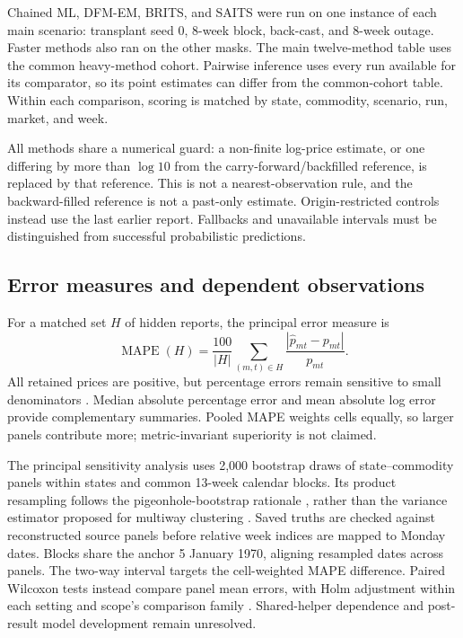 \documentclass[sigconf,nonacm,balance=false]{acmart}
\newcommand{\MAPE}{\operatorname{MAPE}}
\begin{document}
Chained ML, DFM-EM, BRITS, and SAITS were run on one instance of each main scenario: transplant seed 0, 8-week block, back-cast, and 8-week outage. Faster methods also ran on the other masks. The main twelve-method table uses the common heavy-method cohort. Pairwise inference uses every run available for its comparator, so its point estimates can differ from the common-cohort table. Within each comparison, scoring is matched by state, commodity, scenario, run, market, and week.

All methods share a numerical guard: a non-finite log-price estimate, or one differing by more than $\log 10$ from the carry-forward/backfilled reference, is replaced by that reference. This is not a nearest-observation rule, and the backward-filled reference is not a past-only estimate. Origin-restricted controls instead use the last earlier report. Fallbacks and unavailable intervals must be distinguished from successful probabilistic predictions.

\subsection{Error measures and dependent observations}

For a matched set $H$ of hidden reports, the principal error measure is
\begin{equation}\label{eq:mape}
\MAPE(H)=\frac{100}{|H|}\sum_{(m,t)\in H}
\frac{|\hat p_{mt}-p_{mt}|}{p_{mt}}.
\end{equation}
All retained prices are positive, but percentage errors remain sensitive to small denominators \cite{hyndman2006}. Median absolute percentage error and mean absolute log error provide complementary summaries. Pooled MAPE weights cells equally, so larger panels contribute more; metric-invariant superiority is not claimed.

The principal sensitivity analysis uses 2,000 bootstrap draws of state--commodity panels within states and common 13-week calendar blocks. Its product resampling follows the pigeonhole-bootstrap rationale \cite{owen2007}, rather than the variance estimator proposed for multiway clustering \cite{cameron2011}. Saved truths are checked against reconstructed source panels before relative week indices are mapped to Monday dates. Blocks share the anchor 5 January 1970, aligning resampled dates across panels. The two-way interval targets the cell-weighted MAPE difference. Paired Wilcoxon tests instead compare panel mean errors, with Holm adjustment within each setting and scope's comparison family \cite{holm1979}. Shared-helper dependence and post-result model development remain unresolved.
\end{document}
